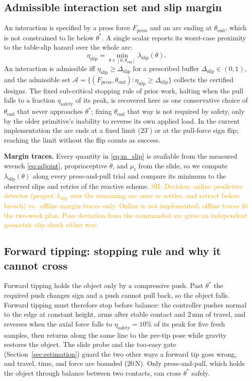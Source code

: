 \documentclass[10pt, conference]{IEEEtran}
\newcommand{\sh}[1]{\textcolor{orange}{SH: #1}}
\begin{document}
\subsection{Admissible interaction set and slip margin}
An interaction is specified by a press force $F_{\mathrm{press}}$ and an arc ending at $\theta_{\mathrm{end}}$, which is not constrained to lie below $\theta^{*}$. A single scalar reports its worst-case proximity to the table-slip hazard over the whole arc:
\begin{equation}
    \eta_{\mathrm{slip}}
    = \min_{\theta \in [0,\theta_{\mathrm{end}}]} \lambda_{\mathrm{slip}}(\theta).
    \label{eq:eta}
\end{equation}
An interaction is admissible iff $\eta_{\mathrm{slip}} \ge \Delta_{\mathrm{slip}}$ for a prescribed buffer $\Delta_{\mathrm{slip}} \in (0,1)$, and the admissible set $\mathcal{A} = \{ (F_{\mathrm{press}}, \theta_{\mathrm{end}}) : \eta_{\mathrm{slip}} \ge \Delta_{\mathrm{slip}} \}$ collects the certified designs. The fixed sub-critical stopping rule of prior work, halting when the pull falls to a fraction $\eta_{\mathrm{safety}}$ of its peak, is recovered here as one conservative choice of $\theta_{\mathrm{end}}$ that never approaches $\theta^{*}$; fixing $\theta_{\mathrm{end}}$ that way is not required by safety, only by the older primitive's inability to reverse its own applied load. In the current implementation the arc ends at a fixed limit ($23^\circ$) or at the pull-force sign flip; reaching the limit without the flip counts as success.

\noindent \textbf{Margin traces.} Every quantity in \eqref{eq:m_slip} is available from the measured wrench \eqref{eq:adjoint}, proprioceptive $\theta$, and $\mu_t$ from the slide, so we compute $\lambda_{\mathrm{slip}}(\theta)$ along every press-and-pull trial and compare its minimum to the observed slips and retries of the reactive scheme. \sh{Decision: online predictive detector (project $\lambda_{\mathrm{slip}}$ over the remaining arc once $m$ settles, and retract before breach) vs.\ offline margin traces only. Online is not implemented; offline traces fit the two-week plan. Pose deviation from the commanded arc gives an independent geometric slip check either way.}

\subsection{Forward tipping: stopping rule and why it cannot cross}
Forward tipping holds the object only by a compressive push. Past $\theta^{*}$ the required push changes sign and a push cannot pull back, so the object falls. Forward tipping must therefore stop before balance: the controller pushes normal to the edge at constant height, arms after stable contact and 2\,mm of travel, and reverses when the axial force falls to $\eta_{\mathrm{safety}} = 10\%$ of its peak for five fresh samples, then returns along the same line to the pre-tip pose while gravity restores the object. The slide probe and the too-easy gate (Section~\ref{sec:estimation}) guard the two other ways a forward tip goes wrong, and travel, time, and force are bounded (20\,N). Only press-and-pull, which holds the object through balance between two contacts, can cross $\theta^{*}$ safely.
\end{document}
